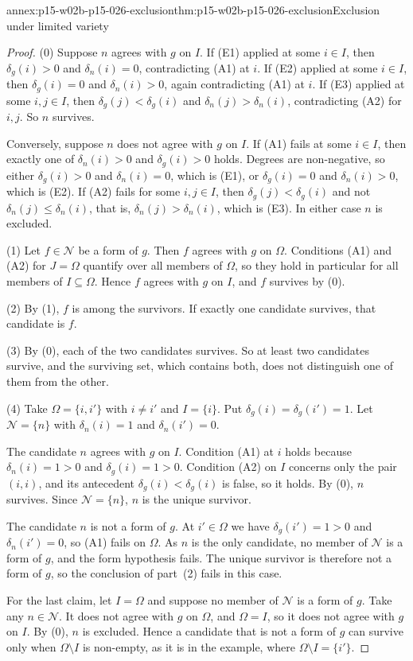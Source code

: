 \begin{annexitem}{annex:p15-w02b-p15-026-exclusion}{thm:p15-w02b-p15-026-exclusion}{Exclusion under limited variety}
\begin{proof}
(0) Suppose $n$ agrees with $g$ on $I$. If (E1) applied at some $i\in I$,
then $\delta_g(i)>0$ and $\delta_n(i)=0$, contradicting (A1) at $i$. If
(E2) applied at some $i\in I$, then $\delta_g(i)=0$ and $\delta_n(i)>0$,
again contradicting (A1) at $i$. If (E3) applied at some $i,j\in I$, then
$\delta_g(j)<\delta_g(i)$ and $\delta_n(j)>\delta_n(i)$, contradicting (A2)
for $i,j$. So $n$ survives.

Conversely, suppose $n$ does not agree with $g$ on $I$. If (A1) fails at
some $i\in I$, then exactly one of $\delta_n(i)>0$ and $\delta_g(i)>0$
holds. Degrees are non-negative, so either $\delta_g(i)>0$ and
$\delta_n(i)=0$, which is (E1), or $\delta_g(i)=0$ and $\delta_n(i)>0$,
which is (E2). If (A2) fails for some $i,j\in I$, then
$\delta_g(j)<\delta_g(i)$ and not $\delta_n(j)\leq\delta_n(i)$, that is,
$\delta_n(j)>\delta_n(i)$, which is (E3). In either case $n$ is excluded.

(1) Let $f\in\mathcal N$ be a form of $g$. Then $f$ agrees with $g$ on
$\Omega$. Conditions (A1) and (A2) for $J=\Omega$ quantify over all
members of $\Omega$, so they hold in particular for all members of
$I\subseteq\Omega$. Hence $f$ agrees with $g$ on $I$, and $f$ survives by
(0).

(2) By (1), $f$ is among the survivors. If exactly one candidate
survives, that candidate is $f$.

(3) By (0), each of the two candidates survives. So at least two
candidates survive, and the surviving set, which contains both, does not
distinguish one of them from the other.

(4) Take $\Omega=\{i,i'\}$ with $i\neq i'$ and $I=\{i\}$. Put
$\delta_g(i)=\delta_g(i')=1$. Let $\mathcal N=\{n\}$ with $\delta_n(i)=1$
and $\delta_n(i')=0$.

The candidate $n$ agrees with $g$ on $I$. Condition (A1) at $i$ holds
because $\delta_n(i)=1>0$ and $\delta_g(i)=1>0$. Condition (A2) on $I$
concerns only the pair $(i,i)$, and its antecedent
$\delta_g(i)<\delta_g(i)$ is false, so it holds. By (0), $n$ survives.
Since $\mathcal N=\{n\}$, $n$ is the unique survivor.

The candidate $n$ is not a form of $g$. At $i'\in\Omega$ we have
$\delta_g(i')=1>0$ and $\delta_n(i')=0$, so (A1) fails on $\Omega$. As $n$
is the only candidate, no member of $\mathcal N$ is a form of $g$, and the
form hypothesis fails. The unique survivor is therefore not a form of $g$,
so the conclusion of part~(2) fails in this case.

For the last claim, let $I=\Omega$ and suppose no member of $\mathcal N$
is a form of $g$. Take any $n\in\mathcal N$. It does not agree with $g$
on $\Omega$, and $\Omega=I$, so it does not agree with $g$ on $I$. By (0),
$n$ is excluded. Hence a candidate that is not a form of $g$ can survive
only when $\Omega\setminus I$ is non-empty, as it is in the example, where
$\Omega\setminus I=\{i'\}$.
\end{proof}
\end{annexitem}

